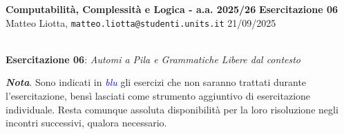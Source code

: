\documentclass[a4paper,10pt]{article}
\newcommand{\EsercitazioneNum}{06}
\newcommand{\Data}{21/09/2025}
\begin{document}
\footnotesize  %

\noindent
\small \textbf{Computabilità, Complessità e Logica - a.a. 2025/26} \hfill \textbf{Esercitazione \EsercitazioneNum} \\[0.2cm]
\scriptsize Matteo Liotta, \texttt{matteo.liotta@studenti.units.it} \hfill \Data \\[0.2cm]

\noindent\makebox[\linewidth]{\rule{\linewidth}{0.4pt}} \\[1cm]


\noindent\Large {} \textbf{Esercitazione 06}: \textit{Automi a Pila e Grammatiche Libere dal contesto}
\begin{osservazioni}
    \textbf{\textit{Nota}}. Sono indicati in \textcolor{blue}{\textit{blu}} gli esercizi che non saranno trattati durante l'esercitazione, bensì lasciati come strumento aggiuntivo di esercitazione individuale. Resta comunque assoluta disponibilità per la loro risoluzione negli incontri successivi, qualora necessario.
\end{osservazioni}
\end{document}
